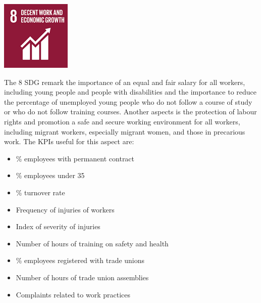 \begin{minipage}[c]{0.2\textwidth}
    \includegraphics[width=\textwidth]{Images/Social_sustainability/8_work.png}
\end{minipage}
\begin{minipage}[c]{0.8\textwidth}
The 8 SDG remark the importance of an equal and fair salary for all workers, including young people and people with disabilities and the importance to reduce the percentage of unemployed young people who do not follow a course of study or who do not follow training courses. Another aspects is the protection of labour rights and promotion a safe and secure working environment for all workers, including migrant workers, especially migrant women, and those in precarious work. The KPIs useful for this aspect are:
\begin{itemize}
    \item \% employees with permanent contract
    \item \% employees under 35 
    \item \% turnover rate
    \item Frequency of injuries of workers
    \item Index of severity of injuries
    \item Number of hours of training on safety and health
    \item \% employees registered with trade unions
    \item Number of hours of trade union assemblies
    \item Complaints related to work practices
\end{itemize}
\end{minipage}

